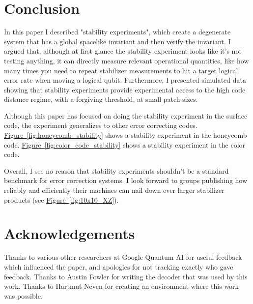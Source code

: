 \documentclass[onecolumn,unpublished,a4paper]{quantumarticle}
\theoremstyle{definition}
\theoremstyle{definition}
\theoremstyle{definition}
\newcommand{\fig}[1]{\hyperref[fig:#1]{Figure~\ref*{fig:#1}}}
\begin{document}
\section{Conclusion}

In this paper I described "stability experiments", which create a degenerate system that has a global spacelike invariant and then verify the invariant.
I argued that, although at first glance the stability experiment looks like it's not testing anything, it can directly measure relevant operational quantities, like how many times you need to repeat stabilizer measurements to hit a target logical error rate when moving a logical qubit.
Furthermore, I presented simulated data showing that stability experiments provide experimental access to the high code distance regime, with a forgiving threshold, at small patch sizes.

Although this paper has focused on doing the stability experiment in the surface code, the experiment generalizes to other error correcting codes.
\fig{honeycomb_stability} shows a stability experiment in the honeycomb code.
\fig{color_code_stability} shows a stability experiment in the color code.

Overall, I see no reason that stability experiments shouldn't be a standard benchmark for error correction systems.
I look forward to groups publishing how reliably and efficiently their machines can nail down ever larger stabilizer products (see \fig{10x10_XZ}).

\section{Acknowledgements}

Thanks to various other researchers at Google Quantum AI for useful feedback which influenced the paper, and apologies for not tracking exactly who gave feedback.
Thanks to Austin Fowler for writing the decoder that was used by this work.
Thanks to Hartmut Neven for creating an environment where this work was possible.





\clearpage
\end{document}
